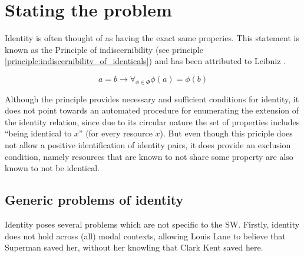 \section{Stating the problem}
\label{sec:stating_the_problem}

Identity is often thought of as having the exact same properies.
This statement is known as the Principle of indiscernibility
(see principle \ref{principle:indiscernibility_of_identicals})
and has been attributed to Leibniz \cite{Forrest2010}.

\begin{principle}
\label{principle:indiscernibility_of_identicals}
\begin{equation}
    a = b
  \rightarrow
    \forall_{\phi \in \Phi} \phi(a) = \phi(b)\nonumber
\end{equation}
\end{principle}

\noindent Although the principle provides necessary and sufficient conditions
  for identity, it does not point towards an automated procedure
  for enumerating the extension of the identity relation,
  since due to its circular nature the set of properties includes
  ``being identical to $x$'' (for every resource $x$).
But even though this priciple does not
  allow a positive identification of identity pairs,
  it does provide an exclusion condition,
  namely resources that are known to not share some property
  are also known to not be identical.

\subsection{Generic problems of identity}

Identity poses several problems which are not specific to the SW.
Firstly, identity does not hold across (all) modal contexts,
  allowing Louis Lane to believe that Superman saved her,
  without her knowling that Clark Kent saved here.

